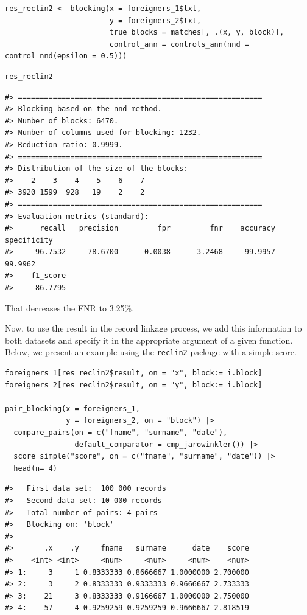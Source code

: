 \begin{verbatim}
res_reclin2 <- blocking(x = foreigners_1$txt,
                        y = foreigners_2$txt,
                        true_blocks = matches[, .(x, y, block)],
                        control_ann = controls_ann(nnd = control_nnd(epsilon = 0.5)))
\end{verbatim}

\begin{verbatim}
res_reclin2
\end{verbatim}

\begin{verbatim}
#> ========================================================
#> Blocking based on the nnd method.
#> Number of blocks: 6470.
#> Number of columns used for blocking: 1232.
#> Reduction ratio: 0.9999.
#> ========================================================
#> Distribution of the size of the blocks:
#>    2    3    4    5    6    7 
#> 3920 1599  928   19    2    2 
#> ========================================================
#> Evaluation metrics (standard):
#>      recall   precision         fpr         fnr    accuracy specificity 
#>     96.7532     78.6700      0.0038      3.2468     99.9957     99.9962 
#>    f1_score 
#>     86.7795
\end{verbatim}

That decreases the FNR to
3.25\%.

Now, to use the result in the record linkage process, we add this
information to both datasets and specify it in the appropriate argument
of a given function. Below, we present an example using the \texttt{reclin2}
package with a simple score.

\begin{verbatim}
foreigners_1[res_reclin2$result, on = "x", block:= i.block]
foreigners_2[res_reclin2$result, on = "y", block:= i.block]

pair_blocking(x = foreigners_1, 
              y = foreigners_2, on = "block") |>
  compare_pairs(on = c("fname", "surname", "date"),
                default_comparator = cmp_jarowinkler()) |>
  score_simple("score", on = c("fname", "surname", "date")) |>
  head(n= 4)
\end{verbatim}

\begin{verbatim}
#>   First data set:  100 000 records
#>   Second data set: 10 000 records
#>   Total number of pairs: 4 pairs
#>   Blocking on: 'block'
#> 
#>       .x    .y     fname   surname      date    score
#>    <int> <int>     <num>     <num>     <num>    <num>
#> 1:     3     1 0.8333333 0.8666667 1.0000000 2.700000
#> 2:     3     2 0.8333333 0.9333333 0.9666667 2.733333
#> 3:    21     3 0.8333333 0.9166667 1.0000000 2.750000
#> 4:    57     4 0.9259259 0.9259259 0.9666667 2.818519
\end{verbatim}

